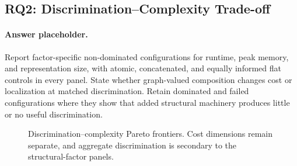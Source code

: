 \subsection{RQ2: Discrimination--Complexity Trade-off}

\paragraph{Answer placeholder.}
Report factor-specific non-dominated configurations for runtime, peak memory,
and representation size, with atomic, concatenated, and equally informed flat
controls in every panel. State whether graph-valued composition changes cost or
localization at matched discrimination. Retain dominated and failed
configurations where they show that added structural machinery produces little
or no useful discrimination.

\begin{figure}[t]
  \centering
  \caption{Discrimination--complexity Pareto frontiers. Cost dimensions remain
  separate, and aggregate discrimination is secondary to the structural-factor
  panels.}
  \label{fig:pareto-frontiers}
\end{figure}

\begin{table}[t]
  \centering
  \caption{Representative expression trade-offs. Atomic, concatenated, and
  flat-materialized, and graph-composed configurations are compared at matched
  settings.}
  \label{tab:expression-tradeoffs}
\end{table}
